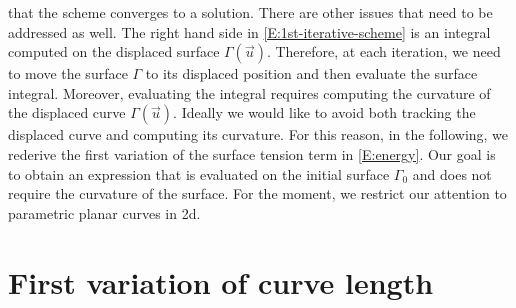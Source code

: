\documentclass[10pt,a4paper]{article}
\begin{document}
that the scheme converges to a solution. 
There are other issues that need to be addressed 
as well. The right hand side in \eqref{E:1st-iterative-scheme}
is an integral computed on the displaced surface
$\Gamma(\vec{u})$. Therefore, at each iteration, 
we need to move the surface $\Gamma$ to its displaced
position and then evaluate the surface integral. 
Moreover, evaluating the integral requires computing
the curvature of the displaced curve $\Gamma(\vec{u})$.
Ideally we would like to avoid both tracking the displaced
curve and computing its curvature. For this reason,
in the following, we rederive the first variation
of the surface tension term in \eqref{E:energy}. 
Our goal is to obtain an expression that is
evaluated on the initial surface $\Gamma_0$
and does not require the curvature of the surface.
For the moment, we restrict our attention 
to parametric planar curves in 2d. 


\section{First variation of curve length}
\end{document}
